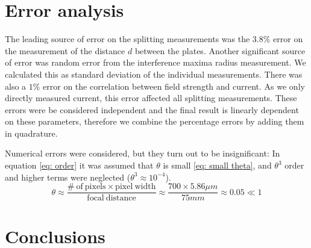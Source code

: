 \documentclass[11pt]{article}
\begin{document}
\section{Error analysis} \label{sec: err}
The leading source of error on the splitting measurements was the $3.8\%$ error on the measurement of the distance $d$ between the plates. Another significant source of error was random error from the interference maxima radius measurement. We calculated this as standard deviation of the individual measurements. There was also a $1\%$ error on the correlation between field strength and current. As we only directly measured current, this error affected all splitting measurements. These errors were be considered independent and the final result is linearly dependent on these parameters, therefore we combine the percentage errors by adding them in quadrature.

Numerical errors were considered, but they turn out to be insignificant: In equation \eqref{eq: order} it was assumed that $\theta$ is small \eqref{eq: small theta}, and $\theta^3$ order and higher terms were neglected ($\theta^3 \approx 10^{-4}$). 
\begin{equation}
    \theta \approx \frac{\mathrm{\#\ of\ pixels} \times \mathrm{pixel\ width}}{\mathrm{focal\ distance}} \approx \frac{700 \times 5.86 \si{\mu m}}{75 \si{mm}}
    \approx 0.05 \ll 1
    \label{eq: small theta}
\end{equation}

\section{Conclusions} \label{sec: conclusion}
\end{document}
